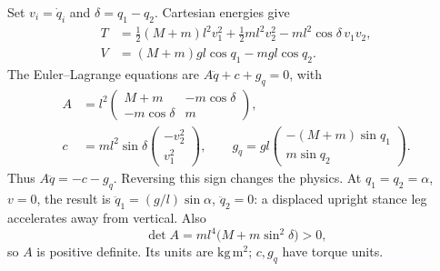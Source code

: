 Set $v_i=\dot q_i$ and $\delta=q_1-q_2$. Cartesian energies give
\begin{align}
 T&=\tfrac12(M+m)l^2v_1^2+\tfrac12ml^2v_2^2-ml^2\cos\delta\,v_1v_2,\\
 V&=(M+m)gl\cos q_1-mgl\cos q_2.
\end{align}
The Euler--Lagrange equations are $A\ddot q+c+g_q=0$, with
\begin{align}
 A&=l^2\begin{pmatrix}M+m&-m\cos\delta\\-m\cos\delta&m\end{pmatrix},\\
 c&=ml^2\sin\delta\begin{pmatrix}-v_2^2\\v_1^2\end{pmatrix},\qquad
 g_q=gl\begin{pmatrix}-(M+m)\sin q_1\\m\sin q_2\end{pmatrix}.
\end{align}
Thus $A\ddot q=-c-g_q$. Reversing this sign changes the physics. At
$q_1=q_2=\alpha$, $v=0$, the result is
$\ddot q_1=(g/l)\sin\alpha$, $\ddot q_2=0$: a displaced upright stance leg
accelerates away from vertical. Also
\begin{equation}
 \det A=ml^4\bigl(M+m\sin^2\delta\bigr)>0,
\end{equation}
so $A$ is positive definite. Its units are $\mathrm{kg\,m^2}$; $c,g_q$
have torque units.

